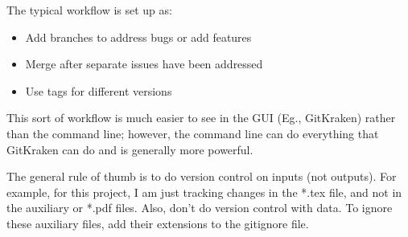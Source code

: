 \documentclass[12pt]{article}
\begin{document}
The typical workflow is set up as:
\begin{itemize}
  \item Add branches to address bugs or add features
  \item Merge after separate issues have been addressed
  \item Use tags for different versions
\end{itemize}

This sort of workflow is much easier to see in the GUI (Eg., GitKraken) rather than the command line; however, the command line can do everything that GitKraken can do and is generally more powerful.

The general rule of thumb is to do version control on inputs (not outputs). For example, for this project, I am just tracking changes in the *.tex file, and not in the auxiliary or *.pdf files. Also, don't do version control with data. To ignore these auxiliary files, add their extensions to the gitignore file.
\end{document}
